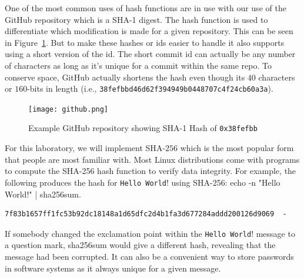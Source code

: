 \documentclass{article}
\begin{document}
One of the most common uses of hash functions are in use with our use
of the GitHub repository which is a SHA-1 digest.
The hash function is used to differentiate
which modification is made for a given repository.  This can be seen
in Figure~\ref{sha.fig}.
But to make these hashes or ids easier to handle it also supports using a
short version of the id. The short commit id can actually be any
number of characters as long as it's unique for a commit within the
same repo.
To conserve space, GitHub actually shortens
the hash even though its $40$ characters or $160$-bits in length (i.e.,
\verb!38fefbbd46d62f394949b0448707c4f24cb60a3a!). 
\begin{figure} [t!]
  \centering
  \texttt{[image: github.png]}
  \caption{Example GitHub repository showing SHA-1 Hash of \texttt{0x38fefbb}}
  \label{sha.fig}
\end{figure}

For this laboratory, we will implement SHA-$256$ which is the most
popular form that people are most familiar with. Most Linux
distributions come with programs to compute the SHA-256 hash function
to verify data integrity. For example, the following produces the hash
for \verb!Hello World!! using SHA-256: echo -n "Hello World!" |
sha256sum.  
\begin{verbatim}
7f83b1657ff1fc53b92dc18148a1d65dfc2d4b1fa3d677284addd200126d9069  -
\end{verbatim}
If somebody changed the exclamation point within the
\verb!Hello World!! message to a question
mark, sha256sum would give a different hash, revealing that the
message had been corrupted.  It can also be a convenient way to store
passwords in software systems as it always unique for a given message.
\end{document}
